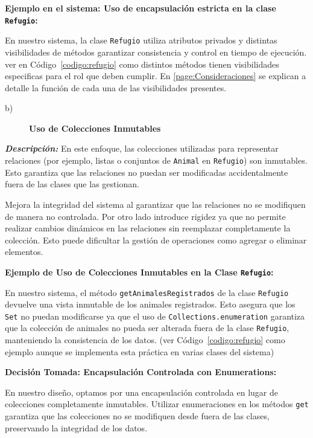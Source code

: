 \textbf{Ejemplo en el sistema: Uso de encapsulación estricta en la clase \texttt{Refugio}:}\par  
En nuestro sistema, la clase \texttt{Refugio} utiliza atributos privados y distintas visibilidades de métodos 
 garantizar consistencia y control en tiempo de ejecución. ver en Código~\ref{codigo:refugio} como distintos métodos tienen visibilidades especificas para el rol que deben cumplir.
 En \ref{page:Consideraciones} se explican a detalle la función de cada una de las visibilidades presentes.


\begin{description}
    \item[b)] \textbf{Uso de Colecciones Inmutables}
\end{description}

\textit{\textbf{Descripción:}}  
En este enfoque, las colecciones utilizadas para representar relaciones (por ejemplo, 
listas o conjuntos de \texttt{Animal} en \texttt{Refugio}) son inmutables. Esto garantiza 
que las relaciones no puedan ser modificadas accidentalmente fuera de las clases que las 
gestionan.
\vspace{0.15cm}

    Mejora la integridad del sistema al garantizar que las relaciones no se modifiquen de 
    manera no controlada.
    Por otro lado introduce rigidez ya que no permite realizar cambios dinámicos en las relaciones sin 
    reemplazar completamente la colección. Esto puede dificultar la gestión de operaciones 
    como agregar o eliminar elementos.\par
    \vspace{0.15cm}

\textbf{Ejemplo de Uso de Colecciones Inmutables en la Clase \texttt{Refugio}:}\par  
En nuestro sistema, el método \texttt{getAnimalesRegistrados} de la clase \texttt{Refugio} 
devuelve una vista inmutable de los animales registrados. Esto asegura que los \texttt{Set} no 
puedan modificarse ya que el uso de \texttt{Collections.}\texttt{enumeration} 
garantiza que la colección de animales no pueda ser alterada fuera de la clase \texttt{Refugio}, 
manteniendo la consistencia de los datos. (ver Código~\ref{codigo:refugio} como ejemplo aunque se implementa esta práctica en varias clases del sistema)

\textbf{Decisión Tomada: Encapsulación Controlada con Enumerations:}\par
En nuestro diseño, optamos por una encapsulación controlada en lugar de colecciones 
completamente inmutables. Utilizar enumeraciones en los métodos \texttt{get} garantiza que las colecciones 
no se modifiquen desde fuera de las clases, preservando la integridad de los datos.

